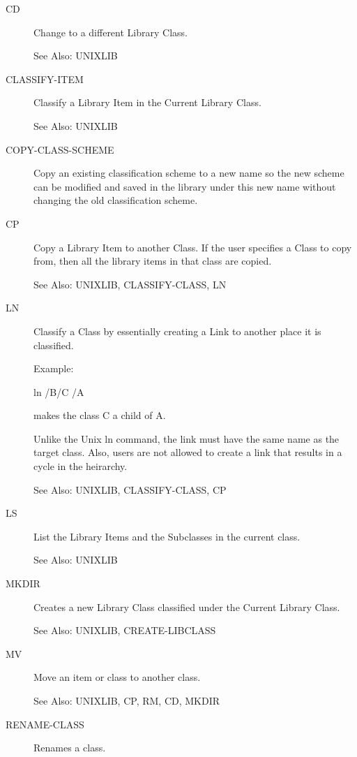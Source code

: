 \begin{description} 
\item[CD]  
Change to a different Library Class.

See Also: UNIXLIB

\item[CLASSIFY-ITEM]  
Classify a Library Item in the Current Library Class.

See Also: UNIXLIB

\item[COPY-CLASS-SCHEME]  
Copy an existing classification scheme to a new name so the new scheme can be modified and saved
in the library under this new name without changing the old classification scheme.

\item[CP]  
Copy a Library Item to another Class.
If the user specifies a Class to copy from,
then all the library items in that class are copied.

See Also: UNIXLIB, CLASSIFY-CLASS, LN

\item[LN]  
Classify a Class by essentially creating
a Link to another place it is classified.

Example:

ln /B/C /A

makes the class C a child of A.

Unlike the Unix ln command, the link must have the same name
as the target class.  Also, users are not allowed to create
a link that results in a cycle in the heirarchy.

See Also: UNIXLIB, CLASSIFY-CLASS, CP

\item[LS]  
List the Library Items and the Subclasses in the current class.

See Also: UNIXLIB

\item[MKDIR]  
Creates a new Library Class classified under
the Current Library Class.

See Also: UNIXLIB, CREATE-LIBCLASS

\item[MV]  
Move an item or class to another class.

See Also:  UNIXLIB, CP, RM, CD, MKDIR

\item[RENAME-CLASS]  
Renames a class.


\end{description}
